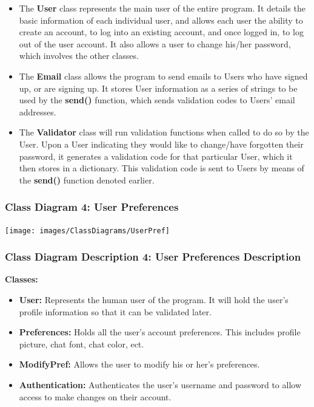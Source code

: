 \documentclass[twoside,letterpaper]{article}
\begin{document}
{\begin{itemize}
	\item The \textbf{User} class represents the main user of the entire program. It details the basic information of each individual user, and allows each user the ability to create an account, to log into an existing account, and once logged in, to log out of the user account. It also allows a user to change his/her password, which involves the other classes.
	\item The \textbf{Email} class allows the program to send emails to Users who have signed up, or are signing up. It stores User information as a series of strings to be used by the \textbf{send()} function, which sends validation codes to Users' email addresses.
	\item The \textbf{Validator} class will run validation functions when called to do so by the User. Upon a User indicating they would like to change/have forgotten their password, it generates a validation code for that particular User, which it then stores in a dictionary. This validation code is sent to Users by means of the \textbf{send()} function denoted earlier.
\end{itemize}

\newpage

\subsubsection[Class Diagram 4: User Preferences]{\rmfamily\bfseries\color{black}
	Class Diagram 4: User Preferences}
\hypertarget{RefHeading22059017292}{}
\bigskip

\texttt{[image: images/ClassDiagrams/UserPref]}

\newpage

\subsubsection[Class Diagram Description 4: User Preferences Description]{\rmfamily\bfseries\color{black}
	Class Diagram Description 4: User Preferences Description}
\hypertarget{RefHeading22059017292}{}

\textbf{Classes:}
\begin{itemize}

       \item \textbf{User:} Represents the human user of the program. It will hold the user's profile information so that it can be validated later.
       \item \textbf{Preferences:} Holds all the user's account preferences. This includes profile picture, chat font, chat color, ect.
       \item \textbf{ModifyPref:} Allows the user to modify his or her's preferences.
       \item \textbf{Authentication:} Authenticates the user's username and password to allow access to make changes on their account.
\end{itemize}

}
\end{document}
